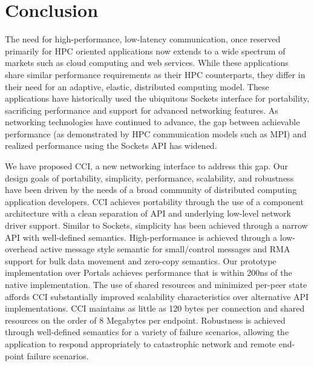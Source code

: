 \section{Conclusion}
\label{sec:conclusion}

The need for high-performance, low-latency communication, once
reserved primarily for HPC oriented applications now extends to a wide
spectrum of markets such as cloud computing and web services. 
While these applications share similar
performance requirements as their HPC counterparts, they differ in
their need for an adaptive, elastic, distributed computing
model. These applications have historically used the ubiquitous
Sockets interface for portability, sacrificing performance and support for advanced
networking features. As networking technologies have
continued to advance, the gap between achievable performance (as
demonstrated by HPC communication models such as MPI) and realized
performance using the Sockets API has widened. 

We have proposed CCI, a new networking interface to address this gap. 
Our design goals of portability, simplicity, performance, scalability,
and robustness have been driven by the needs of a broad community of
distributed computing application developers. CCI achieves portability
through the use of a component architecture with a clean separation of
API and underlying low-level network driver support. Similar to
Sockets, simplicity has been achieved through a narrow API with
well-defined semantics. High-performance is achieved through a
low-overhead active message style semantic for small/control messages
and RMA support for bulk data movement and zero-copy
semantics. Our prototype implementation over Portals achieves performance that is
within 200ns of the native implementation. The use of shared
resources and minimized per-peer state affords CCI substantially
improved scalability characteristics over alternative API
implementations. CCI maintains as little as 120 bytes per connection
and shared resources on the order of 8 Megabytes per endpoint. Robustness is
achieved through well-defined semantics for a variety of failure
scenarios, allowing the application to respond appropriately to
catastrophic network and remote end-point failure scenarios.  




